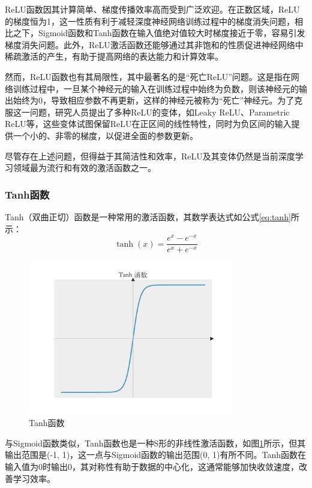 ReLU函数因其计算简单、梯度传播效率高而受到广泛欢迎。在正数区域，ReLU的梯度恒为1，这一性质有利于减轻深度神经网络训练过程中的梯度消失问题，相比之下，Sigmoid函数和Tanh函数在输入值绝对值较大时梯度接近于零，容易引发梯度消失问题。此外，ReLU激活函数还能够通过其非饱和的性质促进神经网络中稀疏激活的产生，有助于提高网络的表达能力和计算效率。

然而，ReLU函数也有其局限性，其中最著名的是“死亡ReLU”问题。这是指在网络训练过程中，一旦某个神经元的输入在训练过程中始终为负数，则该神经元的输出始终为0，导致相应参数不再更新，这样的神经元被称为“死亡”神经元。为了克服这一问题，研究人员提出了多种ReLU的变体，如Leaky ReLU、Parametric ReLU等，这些变体试图保留ReLU在正区间的线性特性，同时为负区间的输入提供一个小的、非零的梯度，以促进全面的参数更新。

尽管存在上述问题，但得益于其简洁性和效率，ReLU及其变体仍然是当前深度学习领域最为流行和有效的激活函数之一。

\subsubsection{Tanh函数}
Tanh（双曲正切）函数是一种常用的激活函数，其数学表达式如公式\ref{eq:tanh}所示：
\begin{equation}
    \tanh(x) = \frac{e^x - e^{-x}}{e^x + e^{-x}}
    \label{eq:tanh}
\end{equation}
\begin{figure}
    \centering
    \includegraphics[width=0.8\textwidth]{Image/tanh.pdf}
    \caption{Tanh函数}
    \label{fig:tanh}
\end{figure}
与Sigmoid函数类似，Tanh函数也是一种S形的非线性激活函数，如图\ref{fig:tanh}所示，但其输出范围是(-1, 1)，这一点与Sigmoid函数的输出范围(0, 1)有所不同。Tanh函数在输入值为0时输出0，其对称性有助于数据的中心化，这通常能够加快收敛速度，改善学习效率。

